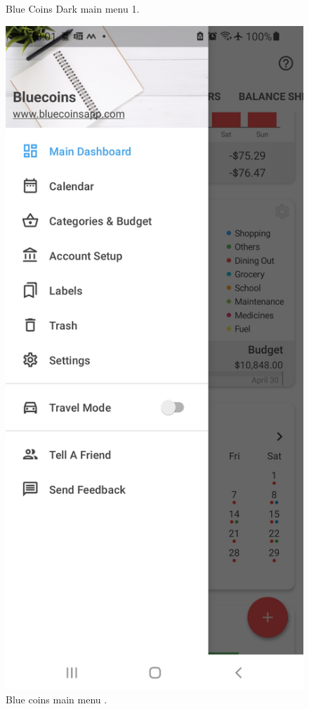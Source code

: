 \begin{figure}[htbp]
\begin{minipage}[b]{0.24\textwidth}
    \caption{Blue Coins Dark main menu 1.}
    \label{fig:image1}
  \end{minipage}
  \hfill
  \begin{minipage}[b]{0.24\textwidth}
    \includegraphics[width=\textwidth]{Screen Shots/BlueCoins/W_ItemMenu.jpg}
    \caption{Blue coins  main menu .}
    \label{fig:image2}
  \end{minipage}
\end{figure}

